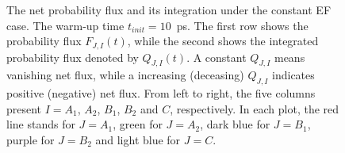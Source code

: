 \documentclass[a4paper,preprint,unsortedaddress,onecolumn]{revtex4-1}
\begin{document}
\begin{figure}
  \caption{
    The net probability flux and its integration under the constant EF case.
    The warm-up time $t_{init} = 10$~ps.
    The first row shows the probability flux $F_{J,I}(t)$, while the second
    shows the integrated  probability flux denoted by $Q_{J,I}(t)$.
    A constant $Q_{J,I}$ means vanishing net flux, while a increasing (deceasing)
    $Q_{J,I}$ indicates positive (negative) net flux.
    From left to right, the five
    columns present $I = A_1$, $A_2$, $B_1$, $B_2$ and
    $C$, respectively. In each plot, the red line stands for $J=A_1$,
    green for $J=A_2$, dark blue for $J=B_1$, purple for $J=B_2$ and light blue
    for $J=C$. 
    }
  \label{fig:tmp6}
\end{figure}

\end{document}
